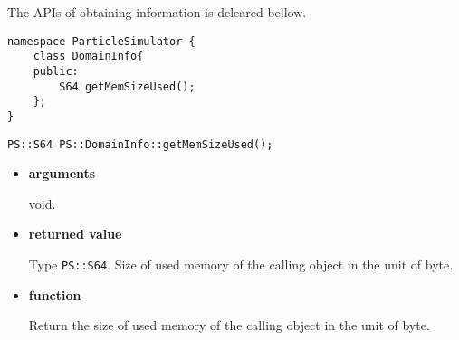 
The APIs of obtaining information is deleared bellow.

\begin{lstlisting}[caption=DomainInfo3]
namespace ParticleSimulator {
    class DomainInfo{
    public:
        S64 getMemSizeUsed();
    };
}
\end{lstlisting}

\begin{screen}
\begin{verbatim}
PS::S64 PS::DomainInfo::getMemSizeUsed();
\end{verbatim}
\end{screen}

\begin{itemize}

\item {\bf arguments}

void.

\item {\bf returned value}

Type \texttt{PS::S64}. Size of used memory of the calling object in
the unit of byte.

\item {\bf function}

Return the size of used memory of the calling object in the unit of byte.


\end{itemize}




